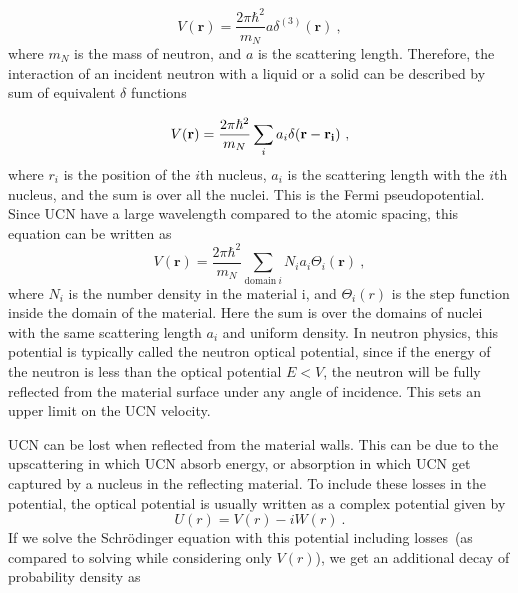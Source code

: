 \begin{equation}
  V(\textbf{r}) = \frac{2 \pi \hbar^2}{m_N} a \delta^{(3)}(\textbf{r})~,
\end{equation}
where $m_N$ is the mass of neutron, and $a$ is the scattering
length. Therefore, the interaction of an incident neutron with a
liquid or a solid can be described by sum of equivalent $\delta$
functions

\begin{equation}
  \label{eqn:vFermi}
  V(\textbf{r}) = \frac{2\pi \hbar^2}{m_N} \sum_i a_i \delta (\bf{r} - \bf{r_i})~,
\end{equation}
where $r_i$ is the position of the $i$th nucleus, $a_i$ is the
scattering length with the $i$th nucleus, and the sum is over all the
nuclei. This is the Fermi pseudopotential. Since UCN have a large
wavelength compared to the atomic spacing, this equation can be
written as
\begin{equation}
  \label{eqn:v}
  V(\textbf{r}) = \frac{2\pi \hbar^2}{m_N}\sum_{\mathrm{domain}~i} N_ia_i\Theta_i(\textbf{r})~,
\end{equation}
where $N_i$ is the number density in the material i, and $\Theta_i(r)$
is the step function inside the domain of the material. Here the sum
is over the domains of nuclei with the same scattering length $a_i$
and uniform density. In neutron physics, this potential is typically
called the neutron optical potential, since if the energy of the
neutron is less than the optical potential $E < V$, the neutron will
be fully reflected from the material surface under any angle of
incidence. This sets an upper limit on the UCN velocity.

UCN can be lost when reflected from the material walls.  This can be
due to the upscattering in which UCN absorb energy, or absorption in
which UCN get captured by a nucleus in the reflecting material. To
include these losses in the potential, the optical potential is usually
written as a complex potential given by
\begin{equation}
  \label{eqn:u}
  U(r) = V(r) - iW(r)~.  
\end{equation}
 If we solve the Schr\"{o}dinger equation with this potential
including losses~(as compared to solving while considering only
$V(r)$), we get an additional decay of probability density as

